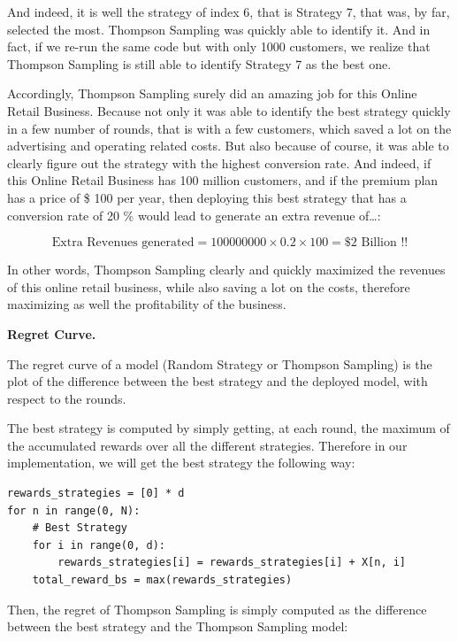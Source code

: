 \documentclass[]{book}
\begin{document}
And indeed, it is well the strategy of index 6, that is Strategy 7, that was, by far, selected the most. Thompson Sampling was quickly able to identify it. And in fact, if we re-run the same code but with only 1000 customers, we realize that Thompson Sampling is still able to identify Strategy 7 as the best one.

Accordingly, Thompson Sampling surely did an amazing job for this Online Retail Business. Because not only it was able to identify the best strategy quickly in a few number of rounds, that is with a few customers, which saved a lot on the advertising and operating related costs. But also because of course, it was able to clearly figure out the strategy with the highest conversion rate. And indeed, if this Online Retail Business has 100 million customers, and if the premium plan has a price of \$ 100 per year, then deploying this best strategy that has a conversion rate of 20 \% would lead to generate an extra revenue of\ldots{}:

\begin{equation*}
    \textrm{Extra Revenues generated} = 100000000 \times 0.2 \times 100 = \textrm{\$ $2$ Billion !!}
\end{equation*}

In other words, Thompson Sampling clearly and quickly maximized the revenues of this online retail business, while also saving a lot on the costs, therefore maximizing as well the profitability of the business.

\textbf{Regret Curve.}

The regret curve of a model (Random Strategy or Thompson Sampling) is the plot of the difference between the best strategy and the deployed model, with respect to the rounds.

The best strategy is computed by simply getting, at each round, the maximum of the accumulated rewards over all the different strategies. Therefore in our implementation, we will get the best strategy the following way:

\begin{lstlisting}
rewards_strategies = [0] * d
for n in range(0, N):
    # Best Strategy
    for i in range(0, d):
        rewards_strategies[i] = rewards_strategies[i] + X[n, i]
    total_reward_bs = max(rewards_strategies)
\end{lstlisting}

Then, the regret of Thompson Sampling is simply computed as the difference between the best strategy and the Thompson Sampling model:
\end{document}
